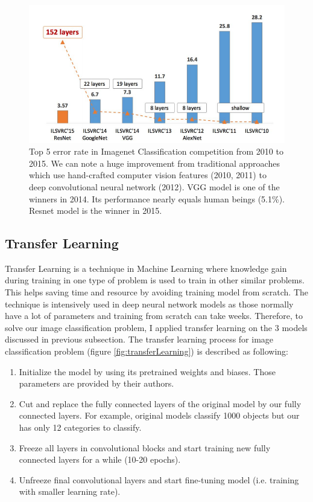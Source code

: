 \begin{figure}[tb]
\centering
\includegraphics[width=0.8\hsize]{./figures/imagenetTop5}
\caption{Top 5 error rate in Imagenet Classification competition from 2010 to 2015. We can note a huge improvement from traditional approaches which use hand-crafted computer vision features (2010, 2011) to deep convolutional neural network (2012). VGG model \cite{DBLP:journals/corr/SimonyanZ14a} is one of the winners in 2014. Its performance nearly equals human beings (5.1\%). Resnet model \cite{DBLP:journals/corr/HeZRS15} is the winner in 2015. }
\label{fig:imagenetTop5Err}
\end{figure}

\subsection{Transfer Learning}
\label{sec:transferLearning}
Transfer Learning is a technique in Machine Learning where knowledge gain during training in one type of problem is used to train in other similar problems. This helps saving time and resource by avoiding training model from scratch. The technique is intensively used in deep neural network models as those normally have a lot of parameters and training from scratch can take weeks. Therefore, to solve our image classification problem, I applied transfer learning on the 3 models discussed in previous subsection. The transfer learning process for image classification problem (figure \ref{fig:transferLearning}) is described as following:
\begin{enumerate}
	\item Initialize the model by using its pretrained weights and biases. Those parameters are provided by their authors.
	\item Cut and replace the fully connected layers of the original model by our  fully connected layers. For example, original models classify 1000 objects but our has only 12 categories to classify.
	\item Freeze all layers in convolutional blocks and start training new fully connected layers for a while (10-20 epochs).
	\item Unfreeze final convolutional layers and start fine-tuning model (i.e. training with smaller learning rate).
\end{enumerate}

